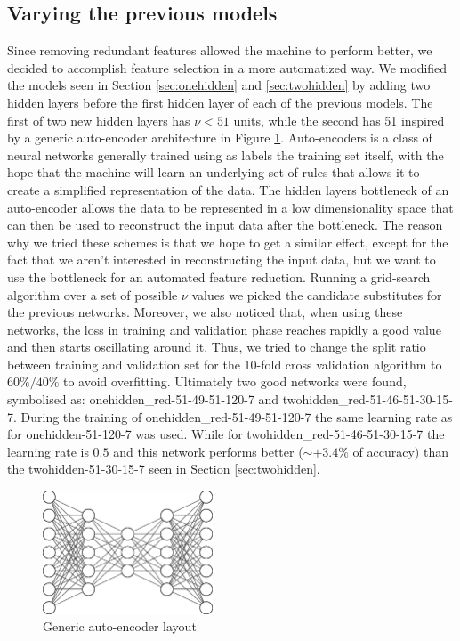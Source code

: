 \subsection{Varying the previous models}
Since removing redundant features allowed the machine to perform better, we decided to accomplish feature selection in a more automatized way. We modified the models seen in Section \ref{sec:onehidden} and \ref{sec:twohidden} by adding two hidden layers before the first hidden layer of each of the previous models. The first of two new hidden layers has $\nu<\text{51}$ units, while the second has 51 inspired by a generic auto-encoder architecture in Figure \ref{fig:autoencoder}.
\newline
Auto-encoders is a class of neural networks generally trained using as labels the training set itself, with the hope that the machine will learn an underlying set of rules that allows it to create a simplified representation of the data. The hidden layers bottleneck of an auto-encoder allows the data to be represented in a low dimensionality space that can then be used to reconstruct the input data after the bottleneck. The reason why we tried these schemes is that we hope to get a similar effect, except for the fact that we aren't interested in reconstructing the input data, but we want to use the bottleneck for an automated feature reduction. Running a grid-search algorithm over a set of possible $\nu$ values we picked the candidate substitutes for the previous networks. Moreover, we also noticed that, when using these networks, the loss in training and validation phase reaches rapidly a good value and then starts oscillating around it. Thus, we tried to change the split ratio between training and validation set for the 10-fold cross validation algorithm to $60\%/40\%$ to avoid overfitting. Ultimately two good networks were found, symbolised as: onehidden\_red-51-49-51-120-7 and twohidden\_red-51-46-51-30-15-7.
\newline
During the training of onehidden\_red-51-49-51-120-7 the same learning rate as for onehidden-51-120-7 was used. While for twohidden\_red-51-46-51-30-15-7 the learning rate is $0.5$ and this network performs better ($\sim +3.4\%$ of accuracy) than the twohidden-51-30-15-7 seen in Section \ref{sec:twohidden}.

\begin{figure}
	\centering
	\includegraphics[width=0.45\textwidth]{./TeX_files/img/autoenc.eps}
	\caption{Generic auto-encoder layout}
	\label{fig:autoencoder}
\end{figure}

